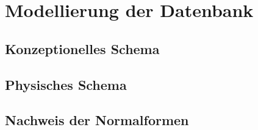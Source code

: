 \chapter{Modellierung der Datenbank}\label{ch:Modellierung der Datenbank}
\section{Konzeptionelles Schema}\label{sec:Konzeptionelles Schema}
\section{Physisches Schema}\label{sec:Physisches Schema}
\section{Nachweis der Normalformen}\label{sec:Nachweis der Normalformen}

